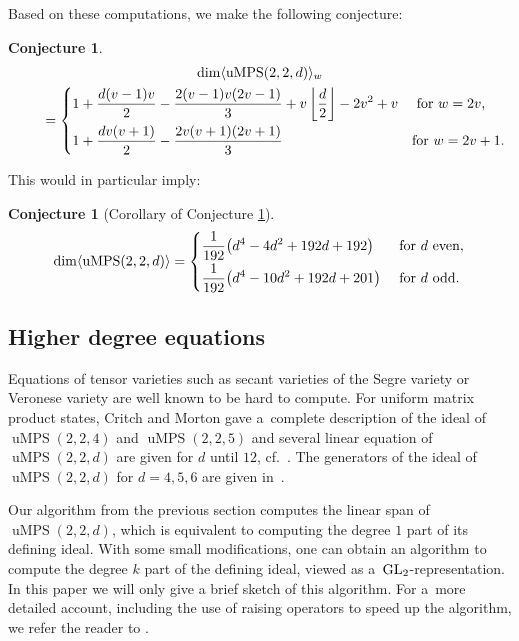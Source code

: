 \documentclass[pdftex]{sigma}
\numberwithin{equation}{section}
\newtheorem{Conjecture}[Theorem]{Conjecture}
\DeclareMathOperator{\uMPS}{uMPS}
\begin{document}
 Based on these computations, we make the following conjecture:

\begin{Conjecture}\label{conj: dim}
	\begin{gather*}
	\dim\langle \uMPS(2,2,d) \rangle_{w} \\
\qquad{} = \begin{cases}
	\displaystyle    1 + \frac{d(v-1)v}{2} - \frac{2(v-1)v(2v-1)}{3} + v\left\lfloor \frac{d}{2}\right\rfloor - 2v^2 + v & \text{ for $w = 2v$,} \vspace{1mm}\\
	 \displaystyle   1 + \frac{dv(v+1)}{2} - \frac{2v(v+1)(2v+1)}{3}             & \text{for $w = 2v+1$.}
	\end{cases}
	\end{gather*}
\end{Conjecture}

This would in particular imply:
\begin{Conjecture}[Corollary of Conjecture \ref{conj: dim}] \label{conj:dimcor}
\[
	\dim \langle \uMPS(2,2,d)\rangle = \begin{cases}
	\displaystyle\frac{1}{192}\big(d^4-4d^2+192d+192\big) & \text{ for $d$ even,}\vspace{1mm}\\
	\displaystyle\frac{1}{192}\big(d^4-10d^2+192d+201\big) & \text{ for $d$ odd.}
	\end{cases}
\]
\end{Conjecture}

\subsection{Higher degree equations}

Equations of tensor varieties such as secant varieties of the Segre variety or Veronese variety are well known to be hard to compute. For uniform matrix product states, Critch and Morton gave a~complete description of the ideal of $\uMPS(2,2,4)$ and $\uMPS(2,2,5)$ and several linear equation of $\uMPS(2,2,d)$ are given for $d$ until $12$, cf.~\cite{Critch2014AlgebraicGO}. The generators of the ideal of $\uMPS(2,2,d)$ for $d=4,5,6$ are given in~\cite{Czaplinski2019UniformMP}.

Our algorithm from the previous section computes the linear span of $\uMPS(2,2,d)$, which is equivalent to computing the degree $1$ part of its defining ideal. With some small modifications, one can obtain an algorithm to compute the degree $k$ part of the defining ideal, viewed as a~${\rm GL}_2$-representation. In this paper we will only give a brief sketch of this algorithm. For a~more detailed account, including the use of raising operators to speed up the algorithm, we refer the reader to \cite{ClaudiasThesis}.
\end{document}
